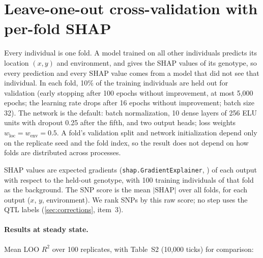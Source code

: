
\section{Leave-one-out cross-validation with per-fold SHAP}
\label{sec:loo}

Every individual is one fold. A model trained on all other individuals
predicts its location $(x, y)$ and environment, and gives the SHAP values
of its genotype, so every prediction and every SHAP value comes from a
model that did not see that individual. In each fold, 10\% of the training
individuals are held out for validation (early stopping after 100 epochs
without improvement, at most 5,000 epochs; the learning rate drops after
16 epochs without improvement; batch size 32). The network is the
\ecolocator default: batch normalization, 10 dense layers of 256 ELU
units with dropout 0.25 after the fifth, and two output heads; loss
weights $w_\text{loc}=w_\text{env}=0.5$. A fold's validation split and
network initialization depend only on the replicate seed and the fold
index, so the result does not depend on how folds are distributed across
processes.

SHAP values are expected gradients (\texttt{shap.GradientExplainer},
\citealp{lundberg_shap_2017}) of each output with respect to the held-out
genotype, with 100 training individuals of that fold as the background.
The SNP score is the mean $|\text{SHAP}|$ over all folds, for each output
($x$, $y$, environment). We rank SNPs by this raw score; no step uses the
QTL labels (\cref{sec:corrections}, item~3).

\paragraph{Results at steady state.} Mean LOO $R^2$ over 100 replicates,
with Table~S2 (10,000 ticks) for comparison:

